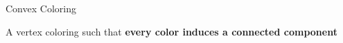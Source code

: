 \begin{frame}{Convex Coloring}

A vertex coloring such that 
\textbf{every color induces a connected component}

\pause

\end{frame}
